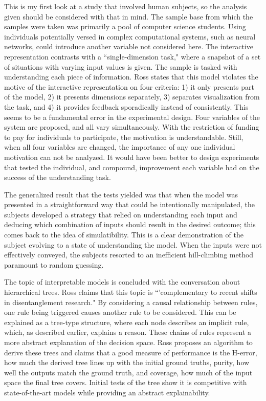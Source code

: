\documentclass[twoside,11pt]{article}
\begin{document}
This is my first look at a study that involved human subjects, so the analysis given should be considered with that in mind. The sample base from which the samples were taken was primarily a pool of computer science students. Using individuals potentially versed in complex computational systems, such as neural networks, could introduce another variable not considered here. The interactive representation contrasts with a ``single-dimension task," where a snapshot of a set of situations with varying input values is given. The sample is tasked with understanding each piece of information. Ross states that this model violates the motive of the interactive representation on four criteria: 1) it only presents part of the model, 2) it presents dimensions separately, 3) separates visualization from the task, and 4) it provides feedback sporadically instead of consistently. This seems to be a fundamental error in the experimental design. Four variables of the system are proposed, and all vary simultaneously. With the restriction of funding to pay for individuals to participate, the motivation is understandable. Still, when all four variables are changed, the importance of any one individual motivation can not be analyzed. It would have been better to design experiments that tested the individual, and compound, improvement each variable had on the success of the understanding task. 

The generalized result that the tests yielded was that when the model was presented in a straightforward way that could be intentionally manipulated, the subjects developed a strategy that relied on understanding each input and deducing which combination of inputs should result in the desired outcome;  this comes back to the idea of simulatibility. This is a clear demonstration of the subject evolving to a state of understanding the model. When the inputs were not effectively conveyed, the subjects resorted to an inefficient hill-climbing method paramount to random guessing. 

The topic of interpretable models is concluded with the conversation about hierarchical trees. Ross claims that this topic is ``'complementary to recent shifts in disentanglement research." By considering a causal relationship between rules, one rule being triggered causes another rule to be considered. This can be explained as a tree-type structure, where each node describes an implicit rule, which, as described earlier, explains a reason. These chains of rules represent a more abstract explanation of the decision space. Ross proposes an algorithm to derive these trees and claims that a good measure of performance is the H-error, how much the derived tree lines up with the initial ground truths, purity, how well the outputs match the ground truth, and coverage, how much of the input space the final tree covers. Initial tests of the tree show it is competitive with state-of-the-art models while providing an abstract explainability. 
\end{document}
